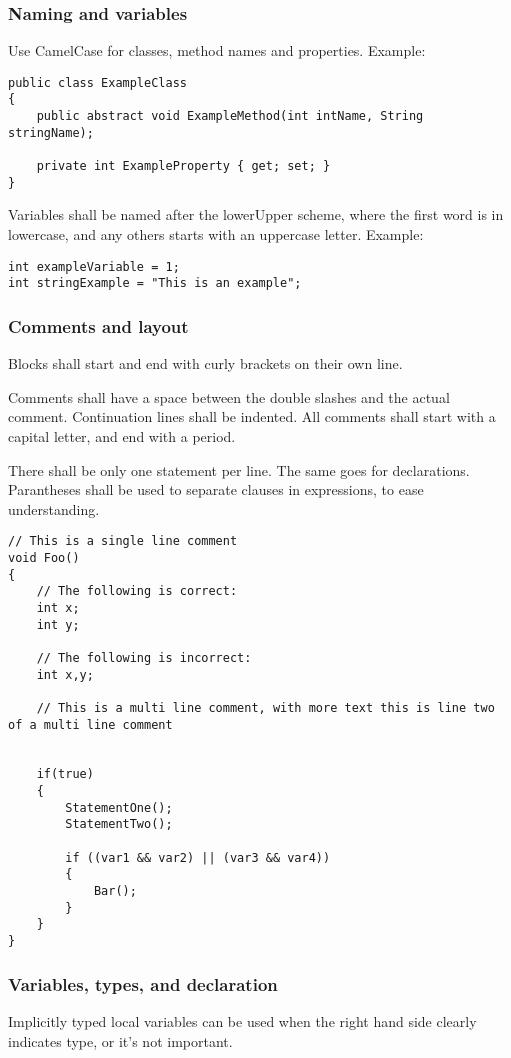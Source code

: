 \documentclass[12pt, a4paper]{article}
\begin{document}
\subsubsection{Naming and variables}
Use CamelCase for classes, method names and properties.
Example:
\begin{lstlisting}
public class ExampleClass
{
	public abstract void ExampleMethod(int intName, String stringName);
	
	private int ExampleProperty { get; set; }
}
\end{lstlisting}

Variables shall be named after the lowerUpper scheme, where the first word is in lowercase, and any others starts with an uppercase letter.
Example:\\
\begin{lstlisting}
int exampleVariable = 1;
int stringExample = "This is an example";
\end{lstlisting}

\subsubsection{Comments and layout}
Blocks shall start and end with curly brackets on their own line.

Comments shall have a space between the double slashes and the actual comment. Continuation lines shall be indented. All comments shall start with a capital letter, and end with a period.

There shall be only one statement per line. The same goes for declarations. Parantheses shall be used to separate clauses in expressions, to ease understanding.

\begin{lstlisting}
// This is a single line comment
void Foo()
{
	// The following is correct:
	int x;
	int y;
	
	// The following is incorrect:
	int x,y;
	
	// This is a multi line comment, with more text this is line two of a multi line comment

	
	if(true)
	{
		StatementOne();
		StatementTwo();
		
		if ((var1 && var2) || (var3 && var4))
		{
			Bar();
		}
	}
}
\end{lstlisting}

\subsubsection{Variables, types, and declaration}
Implicitly typed local variables can be used when the right hand side clearly indicates type, or it's not important.
\end{document}
